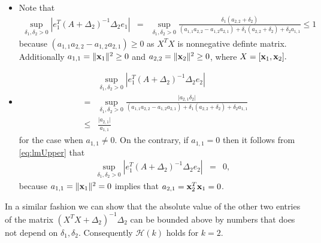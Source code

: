 \documentclass[noinfoline,11pt]{imsart}
\numberwithin{equation}{section}
\theoremstyle{plain}
\newcommand{\lmDelta}{\Delta}
\newcommand{\lmdelta}{\delta}
\newcommand{\lmX}{X}
\newcommand{\norm}[1]{ \Vert #1 \Vert }
\newcommand{\lmA}{A}
\newcommand{\lma}{a}
\newcommand{\lmxbf}{{\bf x}}
\begin{document}
\begin{itemize}
\item Note that
\begin{eqnarray}
 \sup_{\lmdelta_1, \lmdelta_2>0}\left\vert e_{1}^T  \left( \lmA+\lmDelta_2 \right)^{-1}\lmDelta_2 e_1 \right\vert
 & = &  \sup_{\lmdelta_1, \lmdelta_2>0}\frac{    \lmdelta_1(\lma_{2,2}+\lmdelta_2)   }{(\lma_{1,1}\lma_{2,2}-\lma_{1,2}\lma_{2,1})+ \lmdelta_1(\lma_{2,2} + \lmdelta_2) +\lmdelta_2\lma_{1,1}}
\leq 1 \nonumber
\end{eqnarray}
because $(\lma_{1,1}\lma_{2,2}-\lma_{1,2}\lma_{2,1})\geq 0$ as $\lmX^T\lmX$ is nonnegative definte matrix. Additionally  $\lma_{1,1}=\norm{\lmxbf_1}^2\geq 0$ and $\lma_{2,2}=\norm{\lmxbf_2}^2\geq 0$, where $\lmX=[\lmxbf_1, \lmxbf_2].$


 \item  
\begin{eqnarray}\label{eq:lmUpper}
 & & \sup_{\lmdelta_1, \lmdelta_2>0}\left\vert e_{1}^T  \left( \lmA+\lmDelta_2 \right)^{-1}\lmDelta_2 e_2 \right\vert\nonumber\\
 & = &  \sup_{\lmdelta_1, \lmdelta_2>0}\frac{  \vert \lma_{2,1}\lmdelta_2  \vert }{(\lma_{1,1}\lma_{2,2}-\lma_{1,2}\lma_{2,1})+ \lmdelta_1(\lma_{2,2} + \lmdelta_2) +\lmdelta_2\lma_{1,1}}\\
& \leq &  \frac{\vert\lma_{2,1}\vert}{\lma_{1,1}}\nonumber
\end{eqnarray} 
 for the case when $\lma_{1,1}\neq 0$. On the contrary, if   $\lma_{1,1}=0$ then it follows from \ref{eq:lmUpper} that 
 \begin{eqnarray}
\sup_{\lmdelta_1, \lmdelta_2>0}\left\vert e_{1}^T  \left( \lmA+\lmDelta_2 \right)^{-1}\lmDelta_2 e_2 \right\vert
& = &0,\end{eqnarray}
because $\lma_{1,1}=\norm{\lmxbf_1}^2=0$ implies that $\lma_{2,1}=\lmxbf_2^T\lmxbf_1=0$. 
\end{itemize}
 In a similar fashion we can show that  the absolute value of the other two entries of the matrix $ \left( \lmX^T\lmX+\lmDelta_2 \right)^{-1}\lmDelta_2$ can be bounded above by numbers that does not depend on $\lmdelta_1, \lmdelta_2$. Consequently $\mathcal{H}(k)$ holds for $k=2.$
\end{document}
